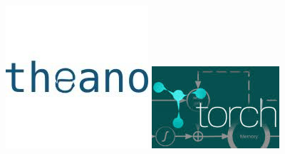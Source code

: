 \documentclass[table,dvipsnames]{beamer}
\begin{document}
{\begin{center}
\includegraphics[scale=0.3]{theano.jpeg} \hspace{1cm}
\includegraphics[scale=0.3]{torch.jpeg} 
\end{center}
}
\end{document}

